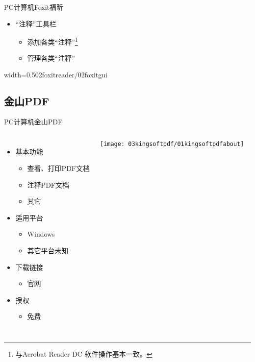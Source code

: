 \documentclass[fontset = none, t, aspectratio=169]{ctexbeamer}
\begin{document}
\begin{frame}{PC计算机}{Foxit福昕}
  \begin{itemize}
  \item \enquote{注释}工具栏
    \begin{itemize}
    \item 添加各类\enquote{注释}\footnote[frame,1]{与Acrobat Reader DC
        软件操作基本一致。}
    \item 管理各类\enquote{注释}
    \end{itemize}
  \end{itemize}
  \begin{center}
    \begin{annotationimage}{width=0.5\textwidth}{02foxitreader/02foxitgui}
    \end{annotationimage}
  \end{center}
\end{frame}


\subsection{金山PDF}
\begin{frame}{PC计算机}{金山PDF}
  \begin{columns}[c]
    \begin{itemize}
    \item 基本功能
      \begin{itemize}
      \item 查看、打印PDF文档
      \item \alert{注释}PDF文档
      \item 其它
      \end{itemize}
    \item 适用平台
      \begin{itemize}
      \item Windows
      \item 其它平台未知
      \end{itemize}
    \item 下载链接
      \begin{itemize}
      \item 官网
      \end{itemize}
    \item 授权
      \begin{itemize}
      \item \alert{免费}
      \end{itemize}
    \end{itemize}
    \texttt{[image: 03kingsoftpdf/01kingsoftpdfabout]}
  \end{columns}
\end{frame}
\end{document}
